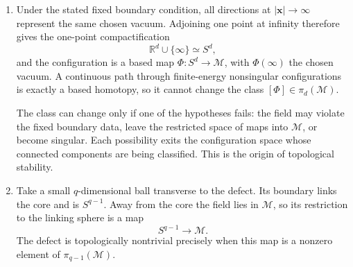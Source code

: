 
\begin{enumerate}
  \begin{enumerate}
    \item[(a)]
    Under the stated fixed boundary condition, all directions at
    \(\lvert\mathbf x\rvert\to\infty\) represent the same chosen vacuum.
    Adjoining one point at infinity therefore gives the one-point
    compactification
    \[
      \mathbb R^d\cup\{\infty\}\simeq S^d,
    \]
    and the configuration is a based map
    \(\Phi:S^d\to\mathcal M\), with \(\Phi(\infty)\) the chosen vacuum.
    A continuous path through finite-energy nonsingular configurations is
    exactly a based homotopy, so it cannot change the class
    \([\Phi]\in\pi_d(\mathcal M)\).

    The class can change only if one of the hypotheses fails: the field
    may violate the fixed boundary data, leave the restricted space of
    maps into \(\mathcal M\), or become singular.  Each possibility exits
    the configuration space whose connected components are being
    classified.  This is the origin of topological stability.
    \item[(b)]
    Take a small \(q\)-dimensional ball transverse to the defect.  Its
    boundary links the core and is \(S^{q-1}\).  Away from the core the
    field lies in \(\mathcal M\), so its restriction to the linking sphere
    is a map
    \[
      S^{q-1}\longrightarrow\mathcal M.
    \]
    The defect is topologically nontrivial precisely when this map is a
    nonzero element of \(\pi_{q-1}(\mathcal M)\).


\end{enumerate}
\end{enumerate}
